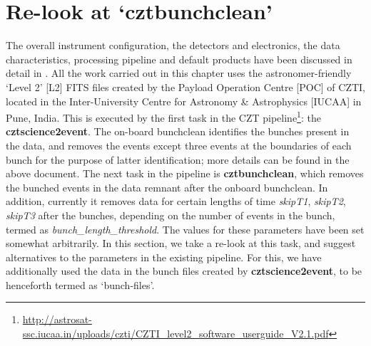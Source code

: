 \section{Re-look at `cztbunchclean'}
\label{sec:Bunchclean}
The overall instrument configuration, the detectors and electronics, the data characteristics, processing pipeline and default products have been discussed in detail in \cite{Bhalerao_et_al.-2017-JApA}. All the work carried out in this chapter uses the astronomer-friendly `Level 2' [L2] FITS files created by the Payload Operation Centre [POC] of CZTI, located in the Inter-University Centre for Astronomy \& Astrophysics [IUCAA] in Pune, India. This is executed by the first task in the CZT pipeline\footnote{\url{http://astrosat-ssc.iucaa.in/uploads/czti/CZTI_level2_software_userguide_V2.1.pdf}}: the  \textbf{cztscience2event}. The on-board bunchclean identifies the bunches present in the data, and removes the events except three events at the boundaries of each bunch for the purpose of latter identification; more details can be found in the above document. The next task in the pipeline is \textbf{cztbunchclean}, which removes the bunched events in the data remnant after the onboard bunchclean. In addition, currently it removes data for certain lengths of time \emph{skipT1}, \emph{skipT2}, \emph{skipT3} after the bunches, depending on the number of events in the bunch, termed as \emph{bunch\_length\_threshold}. The values for these parameters have been set somewhat arbitrarily. In this section, we take a re-look at this task, and suggest alternatives to the parameters in the existing pipeline. For this, we have additionally used the data in the bunch files created by \textbf{cztscience2event}, to be henceforth termed as `bunch-files'.

